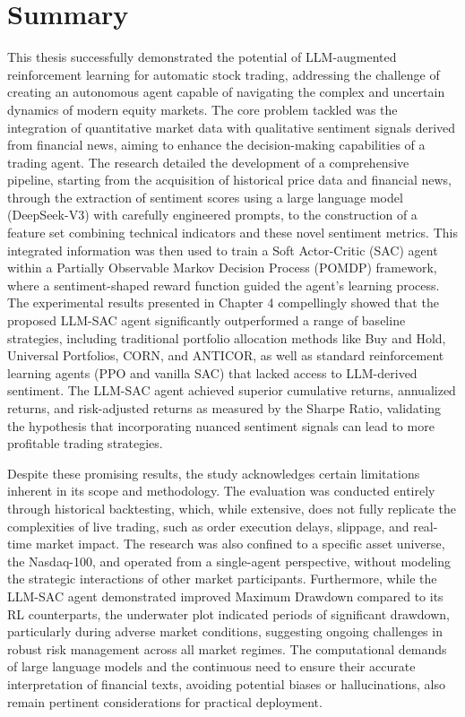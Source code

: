 \section{Summary}
This thesis successfully demonstrated the potential of LLM-augmented reinforcement learning for automatic stock trading, addressing the challenge of creating an autonomous agent capable of navigating the complex and uncertain dynamics of modern equity markets. The core problem tackled was the integration of quantitative market data with qualitative sentiment signals derived from financial news, aiming to enhance the decision-making capabilities of a trading agent. The research detailed the development of a comprehensive pipeline, starting from the acquisition of historical price data and financial news, through the extraction of sentiment scores using a large language model (DeepSeek-V3) with carefully engineered prompts, to the construction of a feature set combining technical indicators and these novel sentiment metrics. This integrated information was then used to train a Soft Actor-Critic (SAC) agent within a Partially Observable Markov Decision Process (POMDP) framework, where a sentiment-shaped reward function guided the agent's learning process. The experimental results presented in Chapter 4 compellingly showed that the proposed LLM-SAC agent significantly outperformed a range of baseline strategies, including traditional portfolio allocation methods like Buy and Hold, Universal Portfolios, CORN, and ANTICOR, as well as standard reinforcement learning agents (PPO and vanilla SAC) that lacked access to LLM-derived sentiment. The LLM-SAC agent achieved superior cumulative returns, annualized returns, and risk-adjusted returns as measured by the Sharpe Ratio, validating the hypothesis that incorporating nuanced sentiment signals can lead to more profitable trading strategies.

Despite these promising results, the study acknowledges certain limitations inherent in its scope and methodology. The evaluation was conducted entirely through historical backtesting, which, while extensive, does not fully replicate the complexities of live trading, such as order execution delays, slippage, and real-time market impact. The research was also confined to a specific asset universe, the Nasdaq-100, and operated from a single-agent perspective, without modeling the strategic interactions of other market participants. Furthermore, while the LLM-SAC agent demonstrated improved Maximum Drawdown compared to its RL counterparts, the underwater plot indicated periods of significant drawdown, particularly during adverse market conditions, suggesting ongoing challenges in robust risk management across all market regimes. The computational demands of large language models and the continuous need to ensure their accurate interpretation of financial texts, avoiding potential biases or hallucinations, also remain pertinent considerations for practical deployment.

